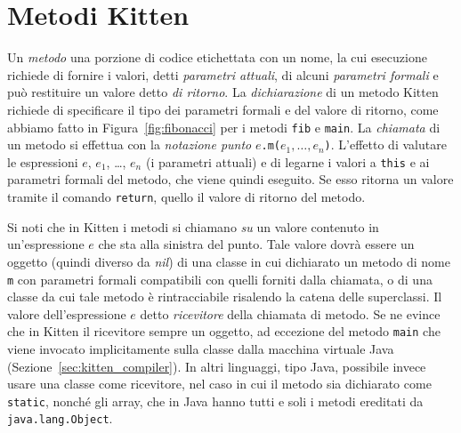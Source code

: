 \section{Metodi Kitten}\label{sec:methods}
%
Un \emph{metodo} \e una porzione di codice etichettata con un nome, la cui
esecuzione richiede di fornire i valori, detti \emph{parametri attuali},
di alcuni \emph{parametri formali}
e pu\`o restituire un valore detto \emph{di ritorno}. La \emph{dichiarazione}
di un metodo Kitten richiede di specificare il tipo dei parametri formali
e del valore di ritorno, come abbiamo fatto
in Figura~\ref{fig:fibonacci} per i metodi \texttt{fib} e \texttt{main}.
La \emph{chiamata} di un metodo si effettua con la \emph{notazione punto}
$e$\texttt{.m(}$e_1,\ldots,e_n$\texttt{)}. L'effetto \e di valutare le
espressioni $e$, $e_1$, \ldots, $e_n$ (i parametri attuali)
e di legarne i valori a \texttt{this} e ai parametri formali del metodo, che
viene quindi eseguito. Se esso ritorna un valore tramite il comando
\texttt{return}, quello \e il valore di ritorno del metodo.

Si noti che in Kitten i metodi si chiamano \emph{su} un valore contenuto
in un'espressione $e$ che sta alla sinistra del punto. Tale valore dovr\`a
essere un oggetto (quindi diverso da \textit{nil}) di una classe in cui
\e dichiarato un metodo di nome \texttt{m} con parametri formali compatibili
con quelli forniti dalla chiamata, o di una classe da cui tale
metodo \`e rintracciabile risalendo la catena delle superclassi.
Il valore dell'espressione $e$ \e detto
\emph{ricevitore} della chiamata di metodo. Se ne evince che in Kitten
il ricevitore \e sempre un oggetto, ad eccezione del metodo \texttt{main}
che viene invocato implicitamente sulla classe dalla macchina virtuale
Java (Sezione~\ref{sec:kitten_compiler}).
In altri linguaggi, tipo Java, \e possibile
invece usare una classe come ricevitore, nel caso in cui il metodo sia
dichiarato come \texttt{static}, nonch\'e gli array, che in Java
hanno tutti e soli i metodi ereditati da \texttt{java.lang.Object}.


